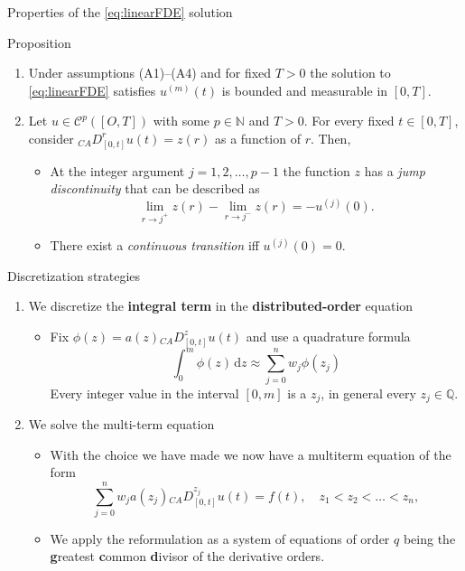 \documentclass[aspectratio=169,xcolor=dvipsnames]{beamer}
\begin{document}
\begin{frame}{Properties of the \eqref{eq:linearFDE} solution}

\begin{alertblock}{Proposition~\parencite{DIETHELM200996}}
\begin{enumerate}
\item Under assumptions (A1)--(A4) and for fixed $T > 0$ the solution to \eqref{eq:linearFDE} satisfies $u^{(m)}(t)$ is bounded and measurable in $[0,T]$.
\item Let $u \in \mathcal{C}^p([O,T])$ with some $p \in \mathbb{N}$ and $T > 0$. For every fixed $t \in [0,T]$, consider ${}_{CA}D_{[0,t]}^r u(t) = z(r)$ as a function of $r$. Then,
\begin{itemize}
	\item \normalsize At the integer argument $j=1,2,\ldots,p-1$ the function $z$ has a \emph{jump discontinuity} that can be described as
	\[
	\lim_{r \rightarrow j^+} z(r) - \lim_{r \rightarrow j^-} z(r) = - u^{(j)}(0).
	\]
	\item \normalsize There exist a \emph{continuous transition} iff $u^{(j)}(0) = 0$.
\end{itemize}
\end{enumerate}
\end{alertblock}


\end{frame}

\begin{frame}{Discretization strategies}

\begin{enumerate}
\item<1-> We discretize the \textbf{integral term} in the \textbf{distributed-order} equation
\begin{itemize} 
	\item[\faCog]<2-> Fix $\phi(z) = a(z) {}_{CA}D_{[0,t]}^z u(t)$ and use a quadrature formula
	\[ \int_{0}^{m} \phi(z)\,\mathrm{d}z \approx \sum_{j=0}^{n} w_j \phi(z_j) \]
	\alert{\faExclamationTriangle} Every integer value in the interval $[0,m]$ is a $z_j$, in
	general every $z_j \in \mathbb{Q}$.
\end{itemize}
\item<1-> We solve the multi-term equation
	\begin{itemize}
	\item[\faCog]<3-> With the choice we have made we now have a multiterm equation of the form
	\[
	\sum_{j=0}^{n} w_j a(z_j) {}_{CA}D^{z_j}_{[0,t]} u(t) = f(t), \quad z_1 < z_2 < \ldots < z_n,
	\]
	\item[\faCog]<4-> We apply the reformulation as a system of equations of order $q$ being
	the \textbf{g}reatest \textbf{c}ommon \textbf{d}ivisor of the derivative orders.
	\end{itemize}
\end{enumerate}

\end{frame}
\end{document}

